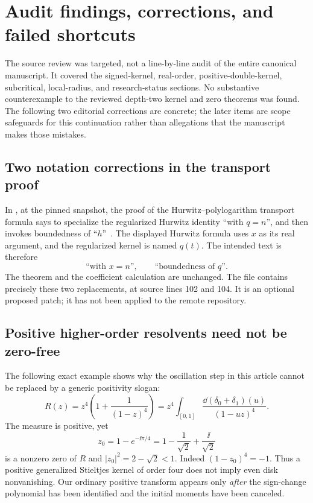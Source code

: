 \section{Audit findings, corrections, and failed shortcuts}
\label{ado:sec:audit}
The source review was targeted, not a line-by-line audit of the entire
canonical manuscript. It covered the signed-kernel,
real-order, positive-double-kernel, subcritical, local-radius, and
research-status sections. No substantive counterexample to the reviewed
depth-two kernel and zero theorems was found. The following two
editorial corrections are concrete; the later items are scope safeguards
for this continuation rather than allegations that the manuscript makes
those mistakes.

\subsection{Two notation corrections in the transport proof}
In , at the pinned snapshot,
the proof of the Hurwitz--polylogarithm transport formula says to
specialize the regularized Hurwitz identity ``with $q=n$'', and then
invokes boundedness of ``$h$''~\cite{repoPositive}. The displayed
Hurwitz formula uses $x$ as its real argument, and the regularized
kernel is named $q(t)$. The intended text is therefore
\[
 \text{``with $x=n$''},\qquad
 \text{``boundedness of $q$''}.
\]
The theorem and the coefficient calculation are unchanged. The file
 contains precisely
these two replacements, at source lines 102 and 104. It is an optional
proposed patch; it has not been applied to the remote repository.

\subsection{Positive higher-order resolvents need not be zero-free}
The following exact example shows why the oscillation step in this
article cannot be replaced by a generic positivity slogan:
\begin{equation}\label{ado:eq:badpositive}
 R(z)=z^4\left(1+\frac1{(1-z)^4}\right)
     =z^4\int_{[0,1]}\frac{\dd(\delta_0+\delta_1)(u)}{(1-uz)^4}.
\end{equation}
The measure is positive, yet
\[
 z_0=1-e^{-\ii\pi/4}
     =1-\frac1{\sqrt2}+\frac{\ii}{\sqrt2}
\]
is a nonzero zero of $R$ and
$|z_0|^2=2-\sqrt2<1$. Indeed $(1-z_0)^4=-1$. Thus a positive
generalized Stieltjes kernel of order four does not imply even disk
nonvanishing. Our ordinary positive transform appears only
\emph{after} the sign-change polynomial has been identified and the
initial moments have been canceled.

